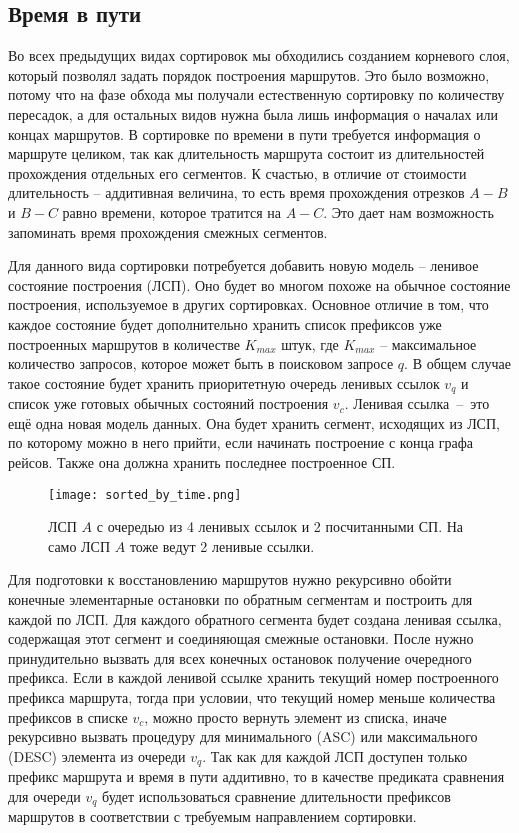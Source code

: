 \FloatBarrier
\subsection{Время в пути}
Во всех предыдущих видах сортировок мы обходились созданием корневого слоя, который позволял задать порядок построения маршрутов. Это было возможно, потому что на фазе обхода мы получали естественную сортировку по количеству пересадок, а для остальных видов нужна была лишь информация о началах или концах маршрутов. В сортировке по времени в пути требуется информация о маршруте целиком, так как длительность маршрута состоит из длительностей прохождения отдельных его сегментов. К счастью, в отличие от стоимости длительность -- аддитивная величина, то есть время прохождения отрезков $A-B$ и $B-C$ равно времени, которое тратится на $A-C$. Это дает нам возможность запоминать время прохождения смежных сегментов.

Для данного вида сортировки потребуется добавить новую модель -- ленивое состояние построения (ЛСП). Оно будет во многом похоже на обычное состояние построения, используемое в других сортировках. Основное отличие в том, что каждое состояние будет дополнительно хранить список префиксов уже построенных маршрутов в количестве $K_{max}$ штук, где $K_{max}$ -- максимальное количество запросов, которое может быть в поисковом запросе $q$. В общем случае такое состояние будет хранить приоритетную очередь ленивых ссылок $v_q$ и список уже готовых обычных состояний построения $v_c$. Ленивая ссылка~--~это ещё одна новая модель данных. Она будет хранить сегмент, исходящих из ЛСП, по которому можно в него прийти, если начинать построение с конца графа рейсов. Также она должна хранить последнее построенное СП.

\begin{figure}[!h]
	\centering
	\texttt{[image: sorted\_by\_time.png]}
	\caption{ЛСП $A$ с очередью из 4 ленивых ссылок и 2 посчитанными СП. На само ЛСП $A$ тоже ведут 2 ленивые ссылки.}\label{fig8}
\end{figure}

Для подготовки к восстановлению маршрутов нужно рекурсивно обойти конечные элементарные остановки по обратным сегментам и построить для каждой по ЛСП. Для каждого обратного сегмента будет создана ленивая ссылка, содержащая этот сегмент и соединяющая смежные остановки. После нужно принудительно вызвать для всех конечных остановок получение очередного префикса. Если в каждой ленивой ссылке хранить текущий номер построенного префикса маршрута, тогда при условии, что текущий номер меньше количества префиксов в списке $v_c$, можно просто вернуть элемент из списка, иначе рекурсивно вызвать процедуру для минимального (ASC) или максимального (DESC) элемента из очереди $v_q$. Так как для каждой ЛСП доступен только префикс маршрута и время в пути аддитивно, то в качестве предиката сравнения для очереди $v_q$ будет использоваться сравнение длительности префиксов маршрутов в соответствии с требуемым направлением сортировки.

